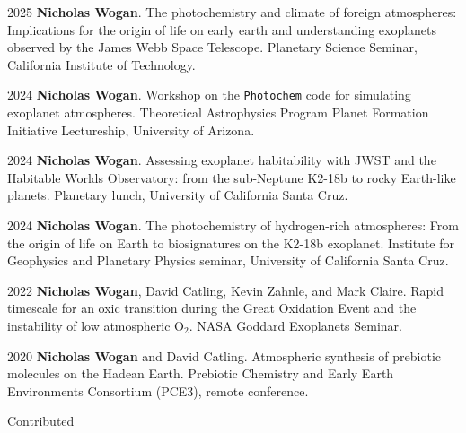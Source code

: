 \documentclass[12pt]{article}
\begin{document}
\begin{cvlist}
\item[2025]
  \textbf{Nicholas Wogan}. The photochemistry and climate of foreign atmospheres: Implications for the origin of life on early earth and understanding exoplanets observed by the James Webb Space Telescope. Planetary Science Seminar, California Institute of Technology.
\item[2024]
  \textbf{Nicholas Wogan}. Workshop on the \texttt{Photochem} code for simulating exoplanet atmospheres. Theoretical Astrophysics Program Planet Formation Initiative Lectureship, University of Arizona.
\item[2024]
  \textbf{Nicholas Wogan}. Assessing exoplanet habitability with JWST and the Habitable Worlds Observatory: from the sub-Neptune K2-18b to rocky Earth-like planets. Planetary lunch, University of California Santa Cruz.
\item[2024]
  \textbf{Nicholas Wogan}. The photochemistry of hydrogen-rich atmospheres: From the origin of life on Earth to biosignatures on the K2-18b exoplanet. Institute for Geophysics and Planetary Physics seminar, University of California Santa Cruz.
\item[2022]
  \textbf{Nicholas Wogan}, David Catling, Kevin Zahnle, and Mark Claire. Rapid timescale for an oxic transition during the Great Oxidation Event and the instability of low atmospheric O$_2$. NASA Goddard Exoplanets Seminar.
\item[2020] 
  \textbf{Nicholas Wogan} and David Catling. Atmospheric synthesis of prebiotic molecules on the Hadean Earth. Prebiotic Chemistry and Early Earth Environments Consortium (PCE3), remote conference.
\end{cvlist}

\noindent Contributed
\end{document}
